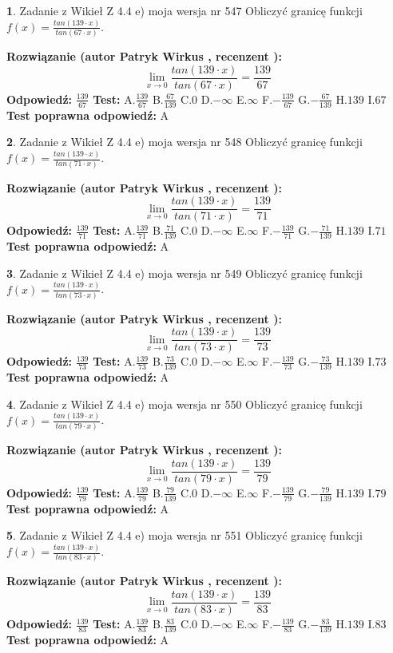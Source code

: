 \documentclass[12pt, a4paper]{article}
\theoremstyle{definition} %
\newtheorem{zad}{}
\newcommand{\zadStart}[1]{\begin{zad}#1\newline}
\newcommand{\zadStop}{\end{zad}}
\newcommand{\rozwStart}[2]{\noindent \textbf{Rozwiązanie (autor #1 , recenzent #2): }\newline}
\newcommand{\rozwStop}{\newline}
\newcommand{\odpStart}{\noindent \textbf{Odpowiedź:}\newline}
\newcommand{\odpStop}{\newline}
\newcommand{\testStart}{\noindent \textbf{Test:}\newline}
\newcommand{\testStop}{\newline}
\newcommand{\kluczStart}{\noindent \textbf{Test poprawna odpowiedź:}\newline}
\newcommand{\kluczStop}{\newline}
\begin{document}
\zadStart{Zadanie z Wikieł Z 4.4 e) moja wersja nr 547}
Obliczyć granicę funkcji $f(x)=\frac{tan(139\cdot x)}{tan(67\cdot x)}$.
\zadStop
\rozwStart{Patryk Wirkus}{}
$$\lim\limits_{x\to 0}\frac{tan(139\cdot x)}{tan(67\cdot x)}=
\frac{139}{67}$$
\rozwStop
\odpStart
$\frac{139}{67}$
\odpStop
\testStart
A.$\frac{139}{67}$
B.$\frac{67}{139}$
C.$0$
D.$-\infty$
E.$\infty$
F.$-\frac{139}{67}$
G.$-\frac{67}{139}$
H.$139$
I.$67$
\testStop
\kluczStart
A
\kluczStop



\zadStart{Zadanie z Wikieł Z 4.4 e) moja wersja nr 548}
Obliczyć granicę funkcji $f(x)=\frac{tan(139\cdot x)}{tan(71\cdot x)}$.
\zadStop
\rozwStart{Patryk Wirkus}{}
$$\lim\limits_{x\to 0}\frac{tan(139\cdot x)}{tan(71\cdot x)}=
\frac{139}{71}$$
\rozwStop
\odpStart
$\frac{139}{71}$
\odpStop
\testStart
A.$\frac{139}{71}$
B.$\frac{71}{139}$
C.$0$
D.$-\infty$
E.$\infty$
F.$-\frac{139}{71}$
G.$-\frac{71}{139}$
H.$139$
I.$71$
\testStop
\kluczStart
A
\kluczStop



\zadStart{Zadanie z Wikieł Z 4.4 e) moja wersja nr 549}
Obliczyć granicę funkcji $f(x)=\frac{tan(139\cdot x)}{tan(73\cdot x)}$.
\zadStop
\rozwStart{Patryk Wirkus}{}
$$\lim\limits_{x\to 0}\frac{tan(139\cdot x)}{tan(73\cdot x)}=
\frac{139}{73}$$
\rozwStop
\odpStart
$\frac{139}{73}$
\odpStop
\testStart
A.$\frac{139}{73}$
B.$\frac{73}{139}$
C.$0$
D.$-\infty$
E.$\infty$
F.$-\frac{139}{73}$
G.$-\frac{73}{139}$
H.$139$
I.$73$
\testStop
\kluczStart
A
\kluczStop



\zadStart{Zadanie z Wikieł Z 4.4 e) moja wersja nr 550}
Obliczyć granicę funkcji $f(x)=\frac{tan(139\cdot x)}{tan(79\cdot x)}$.
\zadStop
\rozwStart{Patryk Wirkus}{}
$$\lim\limits_{x\to 0}\frac{tan(139\cdot x)}{tan(79\cdot x)}=
\frac{139}{79}$$
\rozwStop
\odpStart
$\frac{139}{79}$
\odpStop
\testStart
A.$\frac{139}{79}$
B.$\frac{79}{139}$
C.$0$
D.$-\infty$
E.$\infty$
F.$-\frac{139}{79}$
G.$-\frac{79}{139}$
H.$139$
I.$79$
\testStop
\kluczStart
A
\kluczStop



\zadStart{Zadanie z Wikieł Z 4.4 e) moja wersja nr 551}
Obliczyć granicę funkcji $f(x)=\frac{tan(139\cdot x)}{tan(83\cdot x)}$.
\zadStop
\rozwStart{Patryk Wirkus}{}
$$\lim\limits_{x\to 0}\frac{tan(139\cdot x)}{tan(83\cdot x)}=
\frac{139}{83}$$
\rozwStop
\odpStart
$\frac{139}{83}$
\odpStop
\testStart
A.$\frac{139}{83}$
B.$\frac{83}{139}$
C.$0$
D.$-\infty$
E.$\infty$
F.$-\frac{139}{83}$
G.$-\frac{83}{139}$
H.$139$
I.$83$
\testStop
\kluczStart
A
\kluczStop
\end{document}
